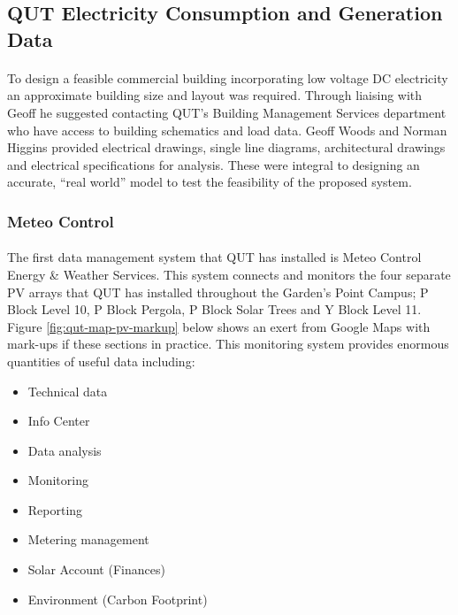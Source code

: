 
\subsection{QUT Electricity Consumption and Generation Data} \label{section:QUT-Data}

\paragraph{}
To design a feasible commercial building incorporating low voltage DC electricity an approximate building size and layout was required. Through liaising with Geoff he suggested contacting QUT's Building Management Services department who have access to building schematics and load data. Geoff Woods and Norman Higgins provided electrical drawings, single line diagrams, architectural drawings and electrical specifications for analysis. These were integral to designing an accurate, ``real world'' model to test the feasibility of the proposed system.

\subsubsection{Meteo Control}

\paragraph{}
The first data management system that QUT has installed is Meteo Control Energy \& Weather Services. This system connects and monitors the four separate PV arrays that QUT has installed throughout the Garden's Point Campus; P Block Level 10, P Block Pergola, P Block Solar Trees and Y Block Level 11. Figure \ref{fig:qut-map-pv-markup} below shows an exert from Google Maps with mark-ups if these sections in practice. This monitoring system provides enormous quantities of useful data including: 

\begin{itemize}[noitemsep,nolistsep]
	\item Technical data 
	\item Info Center
	\item Data analysis
	\item Monitoring
	\item Reporting
	\item Metering management
	\item Solar Account (Finances)
	\item Environment (Carbon Footprint)
\end{itemize} 

